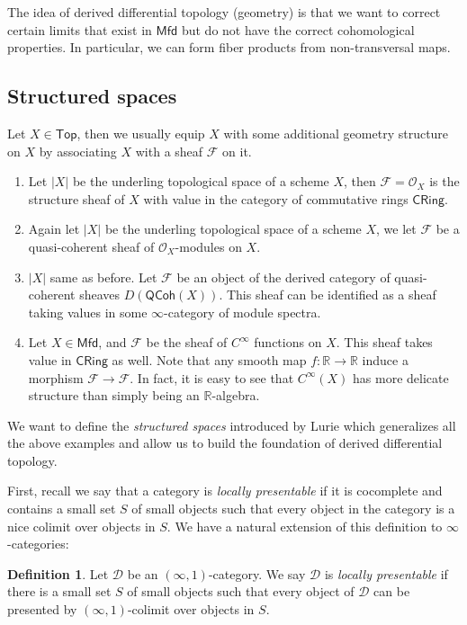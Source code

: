 \documentclass[12pt]{amsart}
\theoremstyle{definition}
\newtheorem{defn}[thm]{Definition}
\theoremstyle{remark}
\numberwithin{equation}{section}
\newcommand{\CF}{{\mathcal F}}
\newcommand{\CO}{{\mathcal O}}
\newcommand{\R}{{\mathbb{R}}}
\newcommand{\1}{{\mathbb{1}}}
\newcommand{\mfd}{\mathsf{Mfd}}
\newcommand{\cring}{\mathsf{CRing}}
\newcommand{\Top}{\mathsf{Top}}
\newcommand{\QCoh}{\mathsf{QCoh}}
\begin{document}
The idea of derived differential topology (geometry) is that we want to correct certain limits that exist in $\mfd$ but do not have the correct cohomological properties. In particular, we can form fiber products from non-transversal maps.

\subsection{Structured spaces}
Let $X\in \Top$, then we usually equip $X$ with some additional geometry structure on $X$ by associating $X$ with a sheaf $\CF$ on it.

	\begin{enumerate}
		\item Let $|X|$ be the underling topological space of a scheme $X$, then $\CF = \CO_X$ is the structure sheaf of $X$ with value in the category of commutative rings $\cring$.
		\item Again let $|X|$ be the underling topological space of a scheme $X$, we let $\CF$ be a quasi-coherent sheaf of $\CO_X$-modules on $X$.
		\item $|X|$ same as before. Let $\CF$ be an object of the derived category of quasi-coherent sheaves $D(\QCoh(X))$. This sheaf can be identified as a sheaf taking values in some $\infty$-category of module spectra.
		\item Let $X\in \mfd$, and $\CF$ be the sheaf of $C^{\infty}$ functions on $X$. This sheaf takes value in $\cring$ as well. Note that any smooth map $f:\R \to \R$ induce a morphism $\CF \to \CF$. In fact, it is easy to see that $C^{\infty}(X)$ has more delicate structure than simply being an $\R$-algebra.  
	\end{enumerate}

We want to define the {\it structured spaces} introduced by Lurie which generalizes all the above examples and allow us to build the foundation of derived differential topology.

First, recall we say that a category is {\it locally presentable} if it is cocomplete and contains a small set $S$ of small objects such that every object in the category is a nice colimit over objects in $S$. We have a natural extension of this definition to $\infty$-categories:
\begin{defn}
	Let $\mathcal{D}$ be an $(\infty,1)$-category. We say $\mathcal{D}$ is {\it locally presentable} if there is a small set $S$ of small objects such that every object of $\mathcal{D}$ can be presented by $(\infty,1)$-colimit over objects in $S$.
\end{defn}
\end{document}
